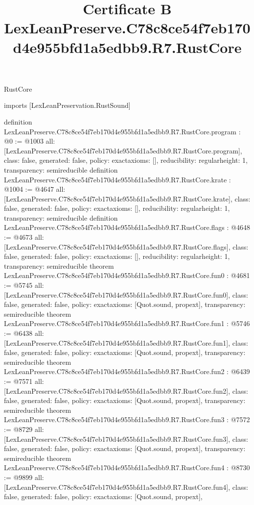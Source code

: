 \begin{lexlean}{RustCore}
\title{Certificate B LexLeanPreserve.C78c8ce54f7eb170d4e955bfd1a5edbb9.R7.RustCore}
\begin{coremodule}
imports [LexLeanPreservation.RustSound]

definition LexLeanPreserve.C78c8ce54f7eb170d4e955bfd1a5edbb9.R7.RustCore.program : @0 := @1003 {
  all: [LexLeanPreserve.C78c8ce54f7eb170d4e955bfd1a5edbb9.R7.RustCore.program],
  class: false,
  generated: false,
  policy: exact{axioms: []},
  reducibility: regular{height: 1},
  transparency: semireducible
}
definition LexLeanPreserve.C78c8ce54f7eb170d4e955bfd1a5edbb9.R7.RustCore.krate : @1004 := @4647 {
  all: [LexLeanPreserve.C78c8ce54f7eb170d4e955bfd1a5edbb9.R7.RustCore.krate],
  class: false,
  generated: false,
  policy: exact{axioms: []},
  reducibility: regular{height: 1},
  transparency: semireducible
}
definition LexLeanPreserve.C78c8ce54f7eb170d4e955bfd1a5edbb9.R7.RustCore.flags : @4648 := @4673 {
  all: [LexLeanPreserve.C78c8ce54f7eb170d4e955bfd1a5edbb9.R7.RustCore.flags],
  class: false,
  generated: false,
  policy: exact{axioms: []},
  reducibility: regular{height: 1},
  transparency: semireducible
}
theorem LexLeanPreserve.C78c8ce54f7eb170d4e955bfd1a5edbb9.R7.RustCore.fun0 : @4681 := @5745 {
  all: [LexLeanPreserve.C78c8ce54f7eb170d4e955bfd1a5edbb9.R7.RustCore.fun0],
  class: false,
  generated: false,
  policy: exact{axioms: [Quot.sound, propext]},
  transparency: semireducible
}
theorem LexLeanPreserve.C78c8ce54f7eb170d4e955bfd1a5edbb9.R7.RustCore.fun1 : @5746 := @6438 {
  all: [LexLeanPreserve.C78c8ce54f7eb170d4e955bfd1a5edbb9.R7.RustCore.fun1],
  class: false,
  generated: false,
  policy: exact{axioms: [Quot.sound, propext]},
  transparency: semireducible
}
theorem LexLeanPreserve.C78c8ce54f7eb170d4e955bfd1a5edbb9.R7.RustCore.fun2 : @6439 := @7571 {
  all: [LexLeanPreserve.C78c8ce54f7eb170d4e955bfd1a5edbb9.R7.RustCore.fun2],
  class: false,
  generated: false,
  policy: exact{axioms: [Quot.sound, propext]},
  transparency: semireducible
}
theorem LexLeanPreserve.C78c8ce54f7eb170d4e955bfd1a5edbb9.R7.RustCore.fun3 : @7572 := @8729 {
  all: [LexLeanPreserve.C78c8ce54f7eb170d4e955bfd1a5edbb9.R7.RustCore.fun3],
  class: false,
  generated: false,
  policy: exact{axioms: [Quot.sound, propext]},
  transparency: semireducible
}
theorem LexLeanPreserve.C78c8ce54f7eb170d4e955bfd1a5edbb9.R7.RustCore.fun4 : @8730 := @9899 {
  all: [LexLeanPreserve.C78c8ce54f7eb170d4e955bfd1a5edbb9.R7.RustCore.fun4],
  class: false,
  generated: false,
  policy: exact{axioms: [Quot.sound, propext]},
}
\end{coremodule}
\end{lexlean}
